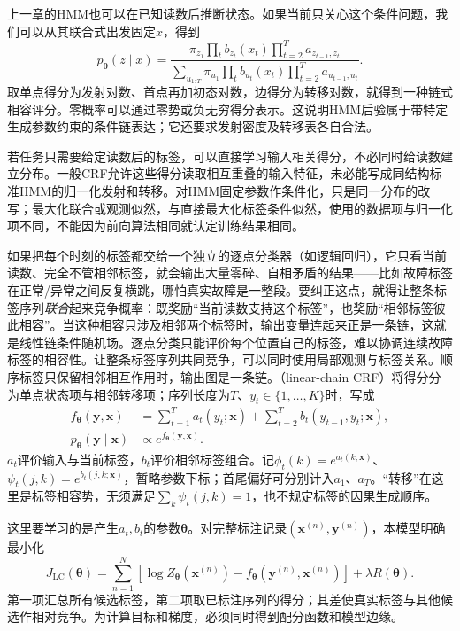 上一章的HMM也可以在已知读数后推断状态。如果当前只关心这个条件问题，我们可以从其联合式出发固定$x$，得到
\begin{equation}
  p_{\bm\theta}(z\mid x)
   =\frac{\pi_{z_1}\prod_t b_{z_t}(x_t)
                      \prod_{t=2}^{T}a_{z_{t-1},z_t}}
          {\sum_{u_{1:T}}\pi_{u_1}\prod_t b_{u_t}(x_t)
                      \prod_{t=2}^{T}a_{u_{t-1},u_t}}.
  \label{eq:pgm-dynamic-undirected-hmm-conditional}
\end{equation}
取单点得分为发射对数、首点再加初态对数，边得分为转移对数，就得到一种链式相容评分。零概率可以通过零势或负无穷得分表示。这说明HMM后验属于带特定生成参数约束的条件链表达；它还要求发射密度及转移表各自合法。

若任务只需要给定读数后的标签，可以直接学习输入相关得分，不必同时给读数建立分布。一般CRF允许这些得分读取相互重叠的输入特征，未必能写成同结构标准HMM的归一化发射和转移。对HMM固定参数作条件化，只是同一分布的改写；最大化联合或观测似然，与直接最大化标签条件似然，使用的数据项与归一化项不同，不能因为前向算法相同就认定训练结果相同。

如果把每个时刻的标签都交给一个独立的逐点分类器（如逻辑回归），它只看当前读数、完全不管相邻标签，就会输出大量零碎、自相矛盾的结果——比如故障标签在正常/异常之间反复横跳，哪怕真实故障是一整段。要纠正这点，就得让整条标签序列\emph{联合}起来竞争概率：既奖励“当前读数支持这个标签”，也奖励“相邻标签彼此相容”。当这种相容只涉及相邻两个标签时，输出变量连起来正是一条链，这就是线性链条件随机场。逐点分类只能评价每个位置自己的标签，难以协调连续故障标签的相容性。让整条标签序列共同竞争，可以同时使用局部观测与标签关系。顺序标签只保留相邻相互作用时，输出图是一条链。（linear-chain CRF）将得分分为单点状态项与相邻转移项；序列长度为$T$、$y_t\in\{1,\ldots,K\}$时，写成
\begin{equation}
  \begin{aligned}
    f_{\bm{\theta}}(\bm{y},\bm{x})
      &=\sum_{t=1}^T a_t(y_t;\bm{x})
        +\sum_{t=2}^T b_t(y_{t-1},y_t;\bm{x}),\\
    p_{\bm{\theta}}(\bm{y}\mid\bm{x})
      &\propto e^{f_{\bm{\theta}}(\bm{y},\bm{x})}.
  \end{aligned}
  \label{eq:pgm-energy-models-chain-score}
\end{equation}
$a_t$评价输入与当前标签，$b_t$评价相邻标签组合。记$\phi_t(k)=e^{a_t(k;\bm{x})}$、$\psi_t(j,k)=e^{b_t(j,k;\bm{x})}$，暂略参数下标；首尾偏好可分别计入$a_1$、$a_T$。“转移”在这里是标签相容势，无须满足$\sum_k\psi_t(j,k)=1$，也不规定标签的因果生成顺序。

这里要学习的是产生$a_t,b_t$的参数$\bm\theta$。对完整标注记录$(\bm x^{(n)},\bm y^{(n)})$，本模型明确最小化
\begin{equation}
  J_{\mathrm{LC}}(\bm\theta)
   =\sum_{n=1}^{N}\left[
        \log Z_{\bm\theta}(\bm x^{(n)})
          -f_{\bm\theta}(\bm y^{(n)},\bm x^{(n)})\right]
       +\lambda R(\bm\theta).
  \label{eq:pgm-dynamic-undirected-linear-objective}
\end{equation}
第一项汇总所有候选标签，第二项取已标注序列的得分；其差使真实标签与其他候选作相对竞争。为计算目标和梯度，必须同时得到配分函数和模型边缘。

